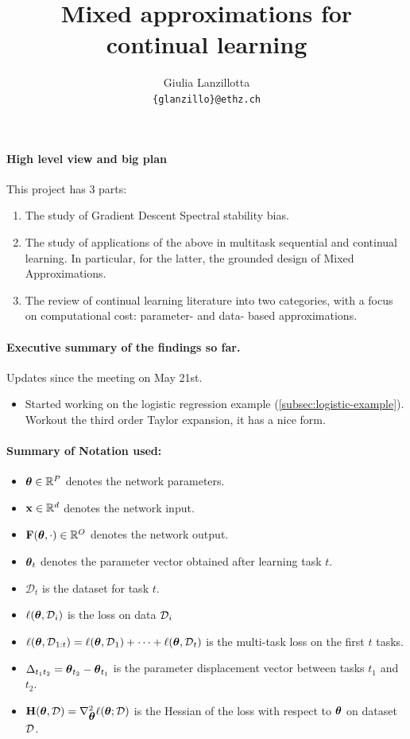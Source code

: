 \documentclass{article} %
\title{Mixed approximations for continual learning}
\author{Giulia Lanzillotta\\
\texttt{\{glanzillo\}@ethz.ch}
}
\newcommand{\hessian}{\vH}
\begin{document}
\maketitle
{}

\paragraph{High level view and big plan}
This project has 3 parts: 
\begin{enumerate}
    \item The study of Gradient Descent Spectral stability bias. 
    \item The study of applications of the above in multitask sequential and continual learning. In particular, for the latter, the grounded design of Mixed Approximations.
    \item The review of continual learning literature into two categories, with a focus on computational cost: parameter- and data- based approximations.
\end{enumerate}

\paragraph{Executive summary of the findings so far.}
Updates since the meeting on May 21st.
\begin{itemize}
    \item Started working on the logistic regression example (\cref{subsec:logistic-example}). Workout the third order Taylor expansion, it has a nice form. 
\end{itemize}


\newpage

\paragraph{Summary of Notation used:}
\begin{itemize}
    \item $\mbox{$\mbox{$\boldsymbol{\theta}$}$} \in \mathbb{R}^P$ denotes the network parameters.
    \item $\mbox{$\mbox{$\mathbf{x}$}$} \in \mathbb{R}^d$ denotes the network input.
    \item $\mbox{$\mbox{$\mathbf{F}$}$}(\mbox{$\mbox{$\boldsymbol{\theta}$}$}, \cdot) \in \mathbb{R}^O$ denotes the network output.
    \item $\mbox{$\mbox{$\boldsymbol{\theta}$}$}_t$ denotes the parameter vector obtained after learning task $t$.
    \item $\mathcal{D}_t$ is the dataset for task $t$.
    \item $\ell(\mbox{$\mbox{$\boldsymbol{\theta}$}$}, \mbox{${\cal D}$}_i)$ is the loss on data $\mbox{${\cal D}$}_i$
    \item $\ell(\mbox{$\mbox{$\boldsymbol{\theta}$}$}, \mbox{${\cal D}$}_{1:t})= \ell(\mbox{$\mbox{$\boldsymbol{\theta}$}$}, \mbox{${\cal D}$}_1) + \dots + \ell(\mbox{$\mbox{$\boldsymbol{\theta}$}$}, \mbox{${\cal D}$}_t)$ is the multi-task loss on the first $t$ tasks.
    \item $\Delta_{t_1t_2} = \mbox{$\mbox{$\boldsymbol{\theta}$}$}_{t_2} - \mbox{$\mbox{$\boldsymbol{\theta}$}$}_{t_1}$ is the parameter displacement vector between tasks $t_1$ and $t_2$.
    \item $\hessian(\vparam, \data) = \nabla^2_{\vparam} \loss(\vparam; \data)$ is the Hessian of the loss with respect to $\mbox{$\mbox{$\boldsymbol{\theta}$}$}$ on dataset $\mbox{${\cal D}$}$.
\end{itemize}
\end{document}
